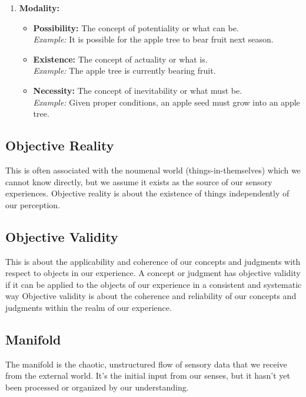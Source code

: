 \documentclass[a4paper]{article}
\begin{document}
\begin{enumerate}
\begin{itemize}
    \end{itemize}
    \item \textbf{Modality:}
    \begin{itemize}
        \item \textbf{Possibility:} The concept of potentiality or what can be. \\
        \textit{Example:} It is possible for the apple tree to bear fruit next season.
        \item \textbf{Existence:} The concept of actuality or what is. \\
        \textit{Example:} The apple tree is currently bearing fruit.
        \item \textbf{Necessity:} The concept of inevitability or what must be. \\
        \textit{Example:} Given proper conditions, an apple seed must grow into an apple tree.
    \end{itemize}
\end{enumerate}

\subsection{Objective Reality}
This is often associated with the noumenal world (things-in-themselves) which we cannot know directly, but we assume it exists as the source of our sensory experiences.
Objective reality is about the existence of things independently of our perception.

\subsection{Objective Validity}
This is about the applicability and coherence of our concepts and judgments with respect to objects in our experience.
A concept or judgment has objective validity if it can be applied to the objects of our experience in a consistent and systematic way
Objective validity is about the coherence and reliability of our concepts and judgments within the realm of our experience.

\subsection{Manifold}
The manifold is the chaotic, unstructured flow of sensory data that we receive from the external world. 
It's the initial input from our senses, but it hasn't yet been processed or organized by our understanding.
\end{document}
